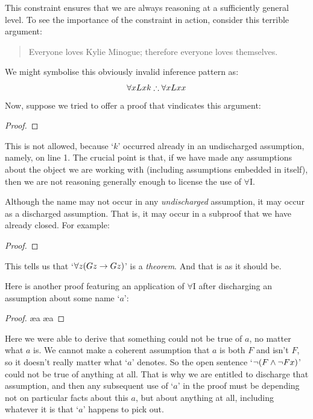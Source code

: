This constraint ensures that we are always reasoning at a sufficiently general level. To see the importance of the constraint in action, consider this terrible argument:
	\begin{quote}
		Everyone loves Kylie Minogue; therefore everyone loves themselves.
	\end{quote}
We might symbolise this obviously invalid inference pattern as:
$$\forall x Lxk \mathrel{\therefore} \forall x Lxx$$
Now, suppose we tried to offer a proof that vindicates this argument:
\begin{proof}
	 
	 
\end{proof}\noindent
This is not allowed, because `$k$' occurred already in an undischarged assumption, namely, on line 1. The crucial point is that, if we have made any assumptions about the object we are working with (including assumptions embedded in  itself), then we are not reasoning generally enough to license  the use of $\forall$I.

Although the name may not occur in any \emph{undischarged} assumption, it may occur as a discharged assumption. That is, it may occur in a subproof that we have already closed. For example:
\begin{proof}
	\open
	\close
\end{proof}
This tells us that `$\forall z (Gz \rightarrow Gz)$' is a \emph{theorem}. And that is as it should be. 

Here is another proof featuring an application of $\forall$I after discharging an assumption about some name `$a$':
\begin{proof}
	\open
	\ae{a}
	\ae{a}
	\close
\end{proof} Here we were able to derive that something could not be true of $a$, no matter what $a$ is. We cannot make a coherent assumption that $a$ is both $F$ and isn't $F$, so it doesn't really matter what `$a$' denotes. So the open sentence `$\neg(F \wedge \neg Fx)$' could not be true of anything at all. That is why we are entitled to discharge that assumption, and then any subsequent use of `$a$' in the proof must be depending not on particular facts about this $a$, but about anything at all, including whatever it is that `$a$' happens to pick out. 


